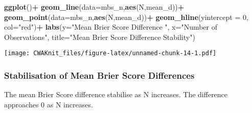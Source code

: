 \documentclass[]{article}
\newenvironment{Shaded}{\begin{snugshade}}{\end{snugshade}}
\newcommand{\KeywordTok}[1]{\textcolor[rgb]{0.13,0.29,0.53}{\textbf{#1}}}
\newcommand{\DataTypeTok}[1]{\textcolor[rgb]{0.13,0.29,0.53}{#1}}
\newcommand{\DecValTok}[1]{\textcolor[rgb]{0.00,0.00,0.81}{#1}}
\newcommand{\StringTok}[1]{\textcolor[rgb]{0.31,0.60,0.02}{#1}}
\newcommand{\OperatorTok}[1]{\textcolor[rgb]{0.81,0.36,0.00}{\textbf{#1}}}
\newcommand{\NormalTok}[1]{#1}
\begin{document}
\begin{Shaded}
\begin{Highlighting}[]
\KeywordTok{ggplot}\NormalTok{()}\OperatorTok{+}
\StringTok{  }\KeywordTok{geom_line}\NormalTok{(}\DataTypeTok{data=}\NormalTok{mbs_n,}\KeywordTok{aes}\NormalTok{(N,mean_d))}\OperatorTok{+}
\StringTok{  }\KeywordTok{geom_point}\NormalTok{(}\DataTypeTok{data=}\NormalTok{mbs_n,}\KeywordTok{aes}\NormalTok{(N,mean_d))}\OperatorTok{+}
\StringTok{  }\KeywordTok{geom_hline}\NormalTok{(}\DataTypeTok{yintercept =} \DecValTok{0}\NormalTok{, }\DataTypeTok{col=}\StringTok{"red"}\NormalTok{)}\OperatorTok{+}
\StringTok{  }\KeywordTok{labs}\NormalTok{(}\DataTypeTok{y=}\StringTok{"Mean Brier Score Difference "}\NormalTok{, }
       \DataTypeTok{x=}\StringTok{"Number of Observations"}\NormalTok{, }
       \DataTypeTok{title=}\StringTok{"Mean Brier Score Difference Stability"}\NormalTok{)}
\end{Highlighting}
\end{Shaded}

\texttt{[image: CWAKnit\_files/figure-latex/unnamed-chunk-14-1.pdf]}

\subsubsection{Stabilisation of Mean Brier Score
Differences}\label{stabilisation-of-mean-brier-score-differences}

The mean Brier Score difference stabilise as N increases. The difference
approaches 0 as N increases.
\end{document}
